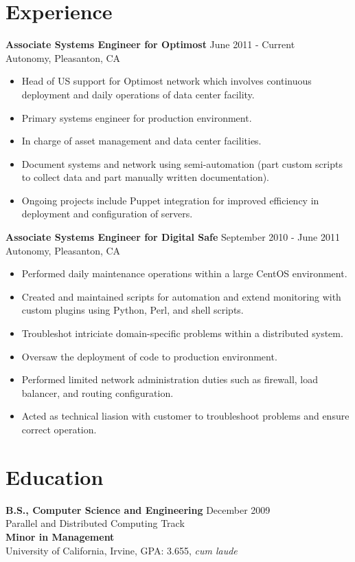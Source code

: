 \documentclass[10pt,line,margin,letterpaper]{res}
\begin{document}
\begin{resume}
\section{Experience}
    {\bf Associate Systems Engineer for Optimost} \hfill June 2011 - Current\\
    Autonomy, Pleasanton, CA
    \begin{itemize} \itemsep -2pt
    \item Head of US support for Optimost network which involves continuous deployment and daily operations of data center facility.
    \item Primary systems engineer for production environment.
    \item In charge of asset management and data center facilities.
    \item Document systems and network using semi-automation (part custom scripts to collect data and part manually written documentation).
    \item Ongoing projects include Puppet integration for improved efficiency in deployment and configuration of servers.
    \end{itemize}

    {\bf Associate Systems Engineer for Digital Safe} \hfill September 2010 - June 2011 \\
    Autonomy, Pleasanton, CA
    \begin{itemize} \itemsep -2pt
    \item Performed daily maintenance operations within a large CentOS environment.
    \item Created and maintained scripts for automation and extend monitoring with custom plugins using Python, Perl, and shell scripts.
    \item Troubleshot intriciate domain-specific problems within a distributed system.
    \item Oversaw the deployment of code to production environment.
    \item Performed limited network administration duties such as firewall, load balancer, and routing configuration.
    \item Acted as technical liasion with customer to troubleshoot problems and ensure correct operation.
    \end{itemize}

\section{Education}
    {\bf B.S., Computer Science and Engineering} \hfill December 2009 \\
    Parallel and Distributed Computing Track \\
    {\bf Minor in Management} \\
    University of California, Irvine, GPA: 3.655, \textit{cum laude}


\end{resume}
\end{document}
